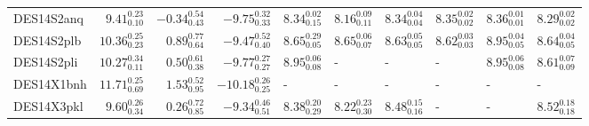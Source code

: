 \documentclass[fleqn,usenatbib,]{mnras}
\begin{document}
\begin{table}
\begin{threeparttable}
\begin{tabular}{lrrrllllll}
DES14S2anq  &   $9.41 _{\scriptscriptstyle 0.10} ^{\scriptscriptstyle 0.23}$ &  $-0.34 _{\scriptscriptstyle 0.43} ^{\scriptscriptstyle 0.54}$ &   $-9.75 _{\scriptscriptstyle 0.33} ^{\scriptscriptstyle 0.32}$ &  $8.34 _{\scriptscriptstyle 0.15} ^{\scriptscriptstyle 0.02}$ &  $8.16 _{\scriptscriptstyle 0.11} ^{\scriptscriptstyle 0.09}$ &  $8.34 _{\scriptscriptstyle 0.04} ^{\scriptscriptstyle 0.04}$ &  $8.35 _{\scriptscriptstyle 0.02} ^{\scriptscriptstyle 0.02}$ &  $8.36 _{\scriptscriptstyle 0.01} ^{\scriptscriptstyle 0.01}$ &  $8.29 _{\scriptscriptstyle 0.02} ^{\scriptscriptstyle 0.02}$ \\
DES14S2plb  &  $10.36 _{\scriptscriptstyle 0.23} ^{\scriptscriptstyle 0.25}$ &   $0.89 _{\scriptscriptstyle 0.64} ^{\scriptscriptstyle 0.77}$ &   $-9.47 _{\scriptscriptstyle 0.40} ^{\scriptscriptstyle 0.52}$ &  $8.65 _{\scriptscriptstyle 0.05} ^{\scriptscriptstyle 0.29}$ &  $8.65 _{\scriptscriptstyle 0.07} ^{\scriptscriptstyle 0.06}$ &  $8.63 _{\scriptscriptstyle 0.05} ^{\scriptscriptstyle 0.05}$ &  $8.62 _{\scriptscriptstyle 0.03} ^{\scriptscriptstyle 0.03}$ &  $8.95 _{\scriptscriptstyle 0.05} ^{\scriptscriptstyle 0.04}$ &  $8.64 _{\scriptscriptstyle 0.05} ^{\scriptscriptstyle 0.04}$ \\
DES14S2pli  &  $10.27 _{\scriptscriptstyle 0.11} ^{\scriptscriptstyle 0.34}$ &   $0.50 _{\scriptscriptstyle 0.38} ^{\scriptscriptstyle 0.61}$ &   $-9.77 _{\scriptscriptstyle 0.27} ^{\scriptscriptstyle 0.27}$ &  $8.95 _{\scriptscriptstyle 0.08} ^{\scriptscriptstyle 0.06}$ &                                                             - &                                                             - &                                                             - &  $8.95 _{\scriptscriptstyle 0.08} ^{\scriptscriptstyle 0.06}$ &  $8.61 _{\scriptscriptstyle 0.09} ^{\scriptscriptstyle 0.07}$ \\
DES14X1bnh  &  $11.71 _{\scriptscriptstyle 0.69} ^{\scriptscriptstyle 0.25}$ &   $1.53 _{\scriptscriptstyle 0.95} ^{\scriptscriptstyle 0.52}$ &  $-10.18 _{\scriptscriptstyle 0.25} ^{\scriptscriptstyle 0.26}$ &                                                             - &                                                             - &                                                             - &                                                             - &                                                             - &                                                             - \\
DES14X3pkl  &   $9.60 _{\scriptscriptstyle 0.34} ^{\scriptscriptstyle 0.26}$ &   $0.26 _{\scriptscriptstyle 0.85} ^{\scriptscriptstyle 0.72}$ &   $-9.34 _{\scriptscriptstyle 0.51} ^{\scriptscriptstyle 0.46}$ &  $8.38 _{\scriptscriptstyle 0.29} ^{\scriptscriptstyle 0.20}$ &  $8.22 _{\scriptscriptstyle 0.30} ^{\scriptscriptstyle 0.23}$ &  $8.48 _{\scriptscriptstyle 0.16} ^{\scriptscriptstyle 0.15}$ &                                                             - &                                                             - &  $8.52 _{\scriptscriptstyle 0.18} ^{\scriptscriptstyle 0.18}$ \\

\end{tabular}
\end{threeparttable}
\end{table}
\end{document}
